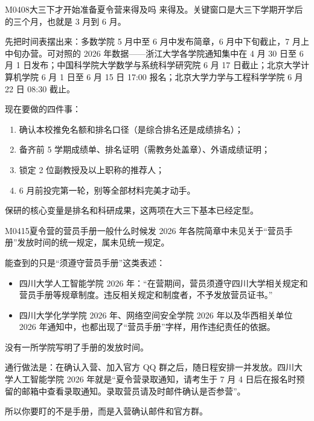 \begin{qa}{M0408}{大三下才开始准备夏令营来得及吗}
来得及。关键窗口是大三下学期开学后的三个月，也就是 3 月到 6 月。

先把时间表摆出来：多数学院 5 月中至 6 月中发布简章，6 月中下旬截止，7 月上中旬办营。可对照的 2026 年数据——浙江大学各学院通知集中在 4 月 30 日至 6 月 1 日发布；中国科学院大学数学与系统科学研究院 6 月 17 日截止；北京大学计算机学院 6 月 1 日至 6 月 15 日 17:00 报名；北京大学力学与工程科学学院 6 月 22 日 08:30 截止。

现在要做的四件事：
\begin{enumerate}
  \item 确认本校推免名额和排名口径（是综合排名还是成绩排名）；
  \item 备齐前 5 学期成绩单、排名证明（需教务处盖章）、外语成绩证明；
  \item 锁定 2 位副教授及以上职称的推荐人；
  \item 6 月前投完第一轮，别等全部材料完美才动手。
\end{enumerate}

保研的核心变量是排名和科研成果，这两项在大三下基本已经定型。
\end{qa}

\begin{qa}{M0415}{夏令营的营员手册一般什么时候发}
2026 年各院简章中未见关于“营员手册”发放时间的统一规定，属未见统一规定。

能查到的只是“须遵守营员手册”这类表述：
\begin{itemize}
  \item 四川大学人工智能学院 2026 年：“在营期间，营员须遵守四川大学相关规定和营员手册等规章制度。违反相关规定和制度者，不予发放营员证书。”
  \item 四川大学化学学院 2026 年、网络空间安全学院 2026 年以及华西相关单位 2026 年通知中，也都出现了“营员手册”字样，用作违纪责任的依据。
\end{itemize}

没有一所学院写明了手册的发放时间。

通行做法是：在确认入营、加入官方 QQ 群之后，随日程安排一并发放。四川大学人工智能学院 2026 年就是“夏令营录取通知，请考生于 7 月 4 日后在报名时预留的邮箱中查看录取通知。录取营员请及时邮件确认是否参营”。

所以你要盯的不是手册，而是入营确认邮件和官方群。
\end{qa}

